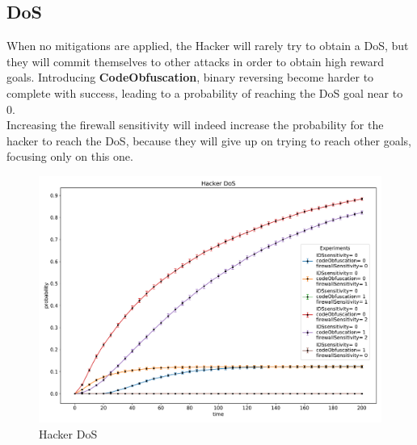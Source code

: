 \subsection*{DoS}
When no mitigations are applied, the Hacker will rarely try to obtain a DoS, but they will commit themselves
to other attacks in order to obtain high reward goals. Introducing \textbf{CodeObfuscation}, binary reversing
become harder to complete with success, leading to a probability of reaching the DoS goal near to 0.\\
Increasing the firewall sensitivity will indeed increase the probability for the hacker to reach the DoS,
because they will give up on trying to reach other goals, focusing only on this one.
\begin{figure}[H]
    \begin{center}
        \includegraphics[scale=0.45]{img/Hacker_DoS.pdf}
    \end{center}
    \caption{Hacker DoS}
    \label{fig:Hacker_DoS}
    \vspace*{-0.8cm}
\end{figure}
\newpage
